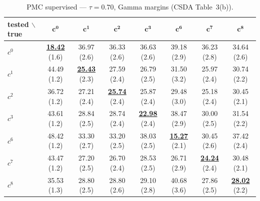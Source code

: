 \begin{table}[htbp]
  \centering
  \small
  \setlength{\tabcolsep}{4pt}
  \caption{PMC supervised — $\tau = 0.70$, Gamma margins (CSDA Table~3(b)).}
  \label{tab:exp1-high_tau_gamma}
  \begin{tabular}{lccccccc}
    \toprule
    tested $\backslash$ true & $\mathbf{c^{0}}$ & $\mathbf{c^{1}}$ & $\mathbf{c^{2}}$ & $\mathbf{c^{3}}$ & $\mathbf{c^{6}}$ & $\mathbf{c^{7}}$ & $\mathbf{c^{8}}$ \\
    \midrule
    $c^{0}$ & \textbf{\underline{18.42}} (1.6) & 36.97 (2.6) & 36.33 (2.6) & 36.63 (2.6) & 39.18 (2.9) & 36.23 (2.8) & 34.64 (2.6) \\
    $c^{1}$ & 44.49 (1.2) & \textbf{\underline{25.43}} (2.3) & 27.59 (2.4) & 26.79 (2.5) & 31.50 (3.2) & 25.97 (2.4) & 30.74 (2.2) \\
    $c^{2}$ & 36.72 (1.2) & 27.21 (2.4) & \textbf{\underline{25.74}} (2.4) & 25.87 (2.4) & 29.48 (3.0) & 25.18 (2.4) & 30.45 (2.1) \\
    $c^{3}$ & 43.61 (1.2) & 28.84 (2.5) & 28.74 (2.4) & \textbf{\underline{22.98}} (2.4) & 38.47 (2.9) & 30.00 (2.5) & 31.54 (2.2) \\
    $c^{6}$ & 48.42 (1.2) & 33.30 (2.7) & 33.20 (2.5) & 38.03 (2.5) & \textbf{\underline{15.27}} (2.1) & 30.45 (2.6) & 37.42 (2.4) \\
    $c^{7}$ & 43.47 (1.2) & 27.20 (2.5) & 26.70 (2.4) & 28.53 (2.5) & 26.71 (2.9) & \textbf{\underline{24.24}} (2.4) & 30.48 (2.1) \\
    $c^{8}$ & 35.53 (1.3) & 28.80 (2.5) & 28.80 (2.6) & 29.10 (2.8) & 40.68 (3.6) & 27.86 (2.5) & \textbf{\underline{28.02}} (2.2) \\
    \bottomrule
  \end{tabular}
\end{table}
